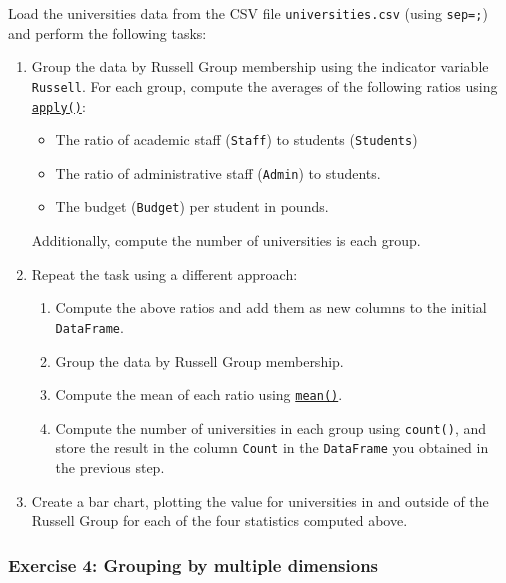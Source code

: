\documentclass{scrartcl}
\providecommand{\tightlist}{%
      \setlength{\itemsep}{0pt}\setlength{\parskip}{0pt}}
\begin{document}
Load the universities data from the CSV file \texttt{universities.csv}
(using \texttt{sep=\textquotesingle{};\textquotesingle{}}) and perform
the following tasks:

\begin{enumerate}
\def\labelenumi{\arabic{enumi}.}
\item
  Group the data by Russell Group membership using the indicator
  variable \texttt{Russell}. For each group, compute the averages of the
  following ratios using
  \href{https://pandas.pydata.org/pandas-docs/stable/reference/api/pandas.core.groupby.GroupBy.apply.html}{\texttt{apply()}}:

  \begin{itemize}
  \tightlist
  \item
    The ratio of academic staff (\texttt{Staff}) to students
    (\texttt{Students})
  \item
    The ratio of administrative staff (\texttt{Admin}) to students.
  \item
    The budget (\texttt{Budget}) per student in pounds.
  \end{itemize}

  Additionally, compute the number of universities is each group.
\item
  Repeat the task using a different approach:

  \begin{enumerate}
  \def\labelenumii{\arabic{enumii}.}
  \tightlist
  \item
    Compute the above ratios and add them as new columns to the initial
    \texttt{DataFrame}.
  \item
    Group the data by Russell Group membership.
  \item
    Compute the mean of each ratio using
    \href{https://pandas.pydata.org/pandas-docs/stable/reference/api/pandas.core.groupby.GroupBy.mean.html}{\texttt{mean()}}.
  \item
    Compute the number of universities in each group using
    \texttt{count()}, and store the result in the column \texttt{Count}
    in the \texttt{DataFrame} you obtained in the previous step.
  \end{enumerate}
\item
  Create a bar chart, plotting the value for universities in and outside
  of the Russell Group for each of the four statistics computed above.
\end{enumerate}

    \hypertarget{exercise-4-grouping-by-multiple-dimensions}{%
\subsubsection{Exercise 4: Grouping by multiple
dimensions}\label{exercise-4-grouping-by-multiple-dimensions}}
\end{document}
